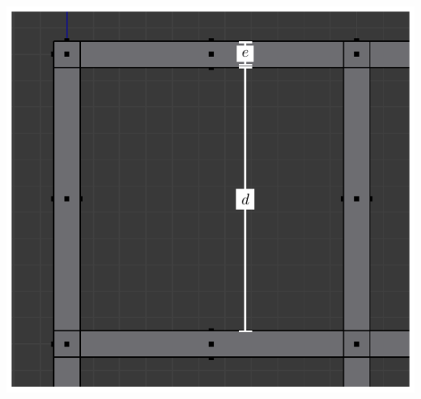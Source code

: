 \documentclass[12pt,addpoints]{exam}
\begin{document}
\begin{questions}
\begin{center} \includegraphics{images/grille.pdf} \end{center}
\newpage
\begin{solution}
	\begin{algorithmic}[1]
	\EndProcedure
	\end{algorithmic}
\end{solution}



\end{questions}
\end{document}

